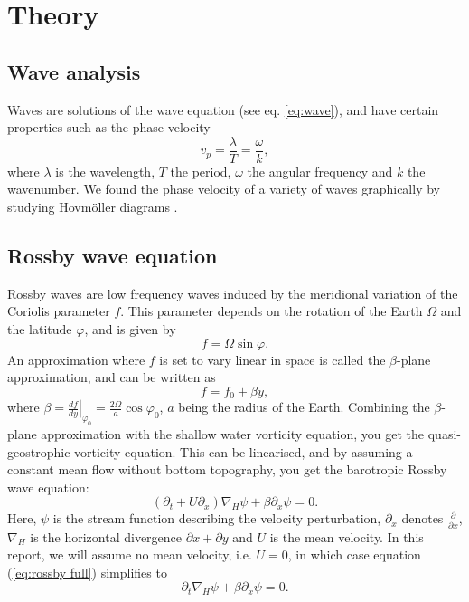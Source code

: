 \section{Theory}
\label{sec:theory}

\subsection{Wave analysis}
\label{sec:waves}
Waves are solutions of the wave equation (see eq. \ref{eq:wave}), and have certain properties such as the phase velocity
	\begin{equation}
	\label{eq:phase}
		v_p = \frac{\lambda}{T} = \frac{\omega}{k},
	\end{equation}
where $\lambda$ is the wavelength, $T$ the period, $\omega$ the angular frequency and $k$ the wavenumber.
We found the phase velocity of a variety of waves graphically by studying Hovmöller diagrams \citep{hovmoller}.

\subsection{Rossby wave equation}
\label{sec:wave}
Rossby waves are low frequency waves induced by the meridional
variation of the Coriolis parameter $f$. This parameter depends on the rotation of the Earth $\Omega$ and the latitude $\varphi$, and is given by 
\begin{equation}
	f = \Omega \sin{\varphi}.
\end{equation} 
An approximation where $f$ is set to vary linear in space is called the $\beta$-plane approximation, and can be written as
\begin{equation}\label{beta-plane}
	f = f_0 + \beta y,
\end{equation} 
where $\beta = \left.\frac{df}{dy}\right|_{\varphi_0} = \frac{2\Omega}{a} \cos{\varphi_0}$, $a$ being the radius of the Earth. Combining the $\beta$-plane approximation with the shallow water vorticity equation, you get the quasi-geostrophic vorticity equation. This can be linearised, and by assuming a constant mean flow without bottom topography, you get the barotropic Rossby wave equation:
\begin{equation}\label{eq:rossby full}
	\left(\partial_t + U\partial_x \right) \nabla_H \psi + \beta \partial_x \psi = 0.
\end{equation}
Here, $\psi$ is the stream function describing the velocity perturbation, $\partial_x$ denotes $\frac{\partial}{\partial x}$, $\nabla_H$ is the horizontal divergence $\partial x + \partial y$ and $U$ is the mean velocity. In this report, we will assume no mean velocity, i.e. $U=0$, in which case equation (\ref{eq:rossby full}) simplifies to 
\begin{equation}\label{eq:rossby}
	\partial_t \nabla_H \psi + \beta \partial_x \psi = 0.
\end{equation}

